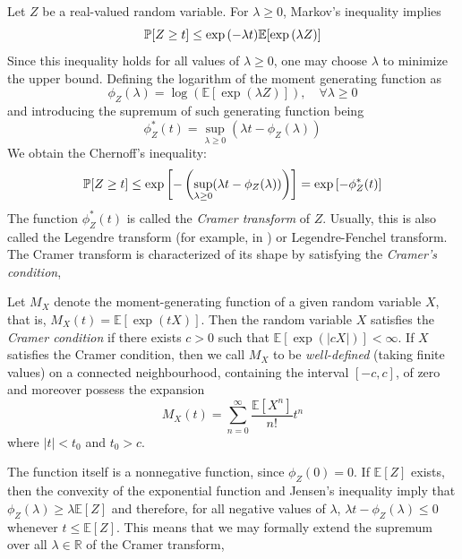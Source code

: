 Let $Z$ be a real-valued random variable. For $\lambda\geq 0$, Markov's inequality implies 
\begin{equation}
    {\mathbb{P}} [Z\geq t] \leq \exp{(-\lambda t)}\mathbb{E}[\exp{(\lambda Z)}]
\end{equation}
Since this inequality holds for all values of $\lambda \geq 0$, one may choose $\lambda$ to minimize the upper bound. Defining the logarithm of the moment generating function as 
\begin{equation}
    \phi_{Z}(\lambda) = \log{(\mathbb{E}[\exp{(\lambda Z)}])}, \quad \forall \lambda \geq 0 
\end{equation}
and introducing the supremum of such generating function being \begin{equation}
    \phi_{Z}^{*}(t) = \sup_{\lambda\geq 0}(\lambda t - \phi_{Z}(\lambda))
\end{equation}
We obtain the Chernoff's inequality: 
\begin{equation}
    {\mathbb{P}} [Z\geq t] \leq \exp{\left[-\left(\sup_{\lambda\geq 0}(\lambda t - \phi_{Z}(\lambda))\right)\right]} = \exp{[-\phi_{Z}^{*}(t)]}
\end{equation}
The function $\phi_{Z}^{*}(t)$ is called the \textit{Cramer transform} of $Z$. Usually, this is also called the Legendre transform (for example, in \cite{OstaszewskaZajkowski2014}) or Legendre-Fenchel transform. The Cramer transform is characterized of its shape by satisfying the \textit{Cramer's condition}, 
\begin{definition}
    Let $M_{X}$ denote the moment-generating function of a given random variable $X$, that is, $M_{X}(t)=\mathbb{E}[\exp{(tX)}]$. Then the random variable $X$ satisfies the \textit{Cramer condition} if there exists $c>0$ such that $\mathbb{E}[\exp{(|cX|)}]< \infty$. If $X$ satisfies the Cramer condition, then we call $M_{X}$ to be \textit{well-defined} (taking finite values) on a connected neighbourhood, containing the interval $[-c,c]$, of zero and moreover possess the expansion
    \begin{equation}
        M_{X}(t) = \sum^{\infty}_{n=0}\frac{\mathbb{E}[X^{n}]}{n!}t^{n}
    \end{equation}
    where $|t|<t_{0}$ and $t_{0}>c$. 
\end{definition}
The function itself is a nonnegative function, since $\phi_{Z}(0)=0$. If $\mathbb{E}[Z]$ exists, then the convexity of the exponential function and Jensen's inequality imply that $\phi_{Z}(\lambda)\geq \lambda \mathbb{E}[Z]$ and therefore, for all negative values of $\lambda$, $\lambda t - \phi_{Z}(\lambda)\leq 0$ whenever $t\leq \mathbb{E}[Z]$. This means that we may formally extend the supremum over all $\lambda \in \mathbb{R}$ of the Cramer transform, 
